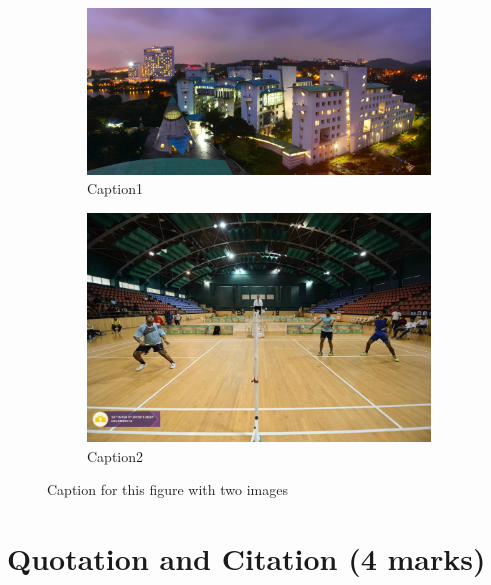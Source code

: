 \documentclass{article}
\begin{document}
\begin{figure}[H]
\centering
    \begin{subfigure}{0.4\textwidth}            
            \includegraphics[width=\linewidth ,height=0.67\linewidth]{3}
            \caption{Caption1}
            \label{3}
    \end{subfigure}%
     \quad
    \begin{subfigure}{0.4\textwidth}
            \centering
            \includegraphics[width=\linewidth]{4}
            \caption{Caption2}
            \label{4}
    \end{subfigure}
    \caption{Caption for this figure with two images}\label{fig:Subfigures}
\end{figure}
\section{Quotation and Citation (4 marks)}
\end{document}
